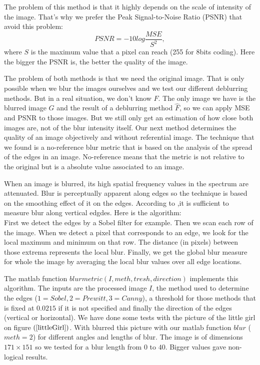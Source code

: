 The problem of this method is that it highly depends on the scale of intensity of the image. That's why we prefer the Peak Signal-to-Noise Ratio (PSNR) that avoid this problem:
\begin{equation}
PSNR = -10 log \frac{MSE}{S^2},
\end{equation}
where $S$ is the maximum value that a pixel can reach (255 for 8bits coding). Here the bigger the PSNR is, the better the quality of the image.

The problem of both methods is that we need the original image. That is only possible when we blur the images ourselves and we test our different deblurring methods. But in a real situation, we don't know $F$. The only image we have is the blurred image $G$ and the result of a deblurring method $\hat{F}$, so we can apply MSE and PSNR to those images. But we still only get an estimation of how close both images are, not of the blur intensity itself. Our next method determines the quality of an image objectively and without referential image. The technique that we found is a no-reference blur metric that is based on the analysis of the spread of the edges in an image. No-reference means that the metric is not relative to the original but is a absolute value associated to an image.

When an image is blurred, its high spatial frequency values in the spectrum are attenuated. Blur is perceptually apparent along edges so the technique is based on the smoothing effect of it on the edges. According to \cite{marziliano2002no},it is sufficient to measure blur along vertical edgdes. Here is the algorithm:\\
First we detect the edges by a Sobel filter for example. Then we scan each row of the image. When we detect a pixel that corresponds to an edge, we look for the local maximum and minimum on that row. The distance (in pixels) between those extrema represents the local blur. Finally, we get the global blur measure for whole the image by averaging the local blur values over all edge locations.

The matlab function $blurmetric(I,meth,tresh,direction)$ implements this algorithm. The inputs are the processed image $I$, the method used to determine the edges ($1=Sobel, 2=Prewitt, 3=Canny$), a threshold for those methods that is fixed at $0.0215$ if it is not specified and finally the direction of the edges (vertical or horizontal). We have done some tests with the picture of the little girl on figure $(\ref{littleGirl})$. With blurred this picture with our matlab function $blur$ ($meth=2$) for different angles and lengths of blur. The image is of dimensions $171 \times 151$ so we tested for a blur length from $0$ to $40$. Bigger values gave non-logical results. 

